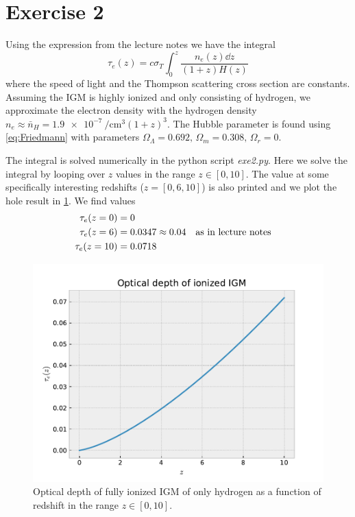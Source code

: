 \documentclass[11pt,a4paper]{article}
\begin{document}
\section*{Exercise 2}
Using the expression from the lecture notes we have the integral
\begin{equation}
\tau_e(z) = c \sigma_T \int_0^z \frac{n_e(z) \dd{z}}{(1+z)H(z)}
\end{equation}
where the speed of light and the Thompson scattering cross section are constants. Assuming the IGM is highly ionized and only consisting of hydrogen, we approximate the electron density with the hydrogen density $n_e \approx \bar{n}_H = \SI{1.9e-7}{\per\cubic\cm}(1+z)^3$. The Hubble parameter is found using \cref{eq:Friedmann} with parameters $\Omega_\Lambda = 0.692,\, \Omega_m = 0.308, \, \Omega_r = 0$.

The integral is solved numerically in the python script \textit{exe2.py}. Here we solve the integral by looping over $z$ values in the range $z\in [0,10]$. The value at some specifically interesting redshifts ($z = [0,6,10]$) is also printed and we plot the hole result in \cref{fig:optical_depth}. We find values
\begin{align*}
\tau_e(z=0) &= 0
\\
\tau_e(z=6) &= 0.0347 \approx 0.04 \qq{as in lecture notes}
\\
\tau_e(z=10) &= 0.0718
\end{align*}

\begin{figure}
\centering
\includegraphics[width=0.8\linewidth]{optical_depth_exe2.pdf}
\caption{Optical depth of fully ionized IGM of only hydrogen as a function of redshift in the range ${z\in[0,10]}$.}
\label{fig:optical_depth}
\end{figure}
\end{document}
